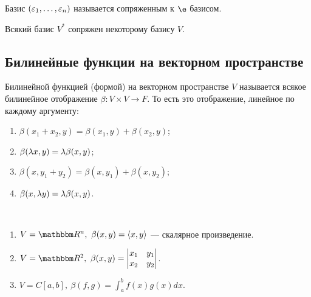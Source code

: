 \begin{Def}
Базис $(\varepsilon_1, \ldots, \varepsilon_n)$ называется сопряженным к $\e$ базисом.
\end{Def}

\begin{Task}
Всякий базис $V^*$ сопряжен некоторому базису $V$.
\end{Task}

\subsection*{Билинейные функции на векторном пространстве}

\begin{Def}
Билинейной функцией (формой) на векторном пространстве $V$ называется всякое билинейное отображение $\beta \colon V \times V \rightarrow F$. То есть это отображение, линейное по каждому аргументу:
\begin{enumerate}
\item $\beta(x_1 + x_2, y) = \beta(x_1, y) + \beta(x_2, y)$; 
\item $\beta(\lambda x, y) = \lambda\beta(x, y)$;
\item $\beta(x, y_1 + y_2) = \beta(x, y_1) + \beta(x, y_2)$;
\item $\beta(x, \lambda y) = \lambda\beta(x, y)$.
\end{enumerate}
\end{Def}

\begin{Examples}\
\begin{enumerate}
\item $V = \R^n,\ \beta(x, y) = \langle x, y \rangle$ --- скалярное произведение. 
\item $V = \R^2,\ \beta(x, y) = \begin{vmatrix}x_1 & y_1 \\ x_2 & y_2\end{vmatrix}$.
\item $V = C[a, b],\ \beta(f, g) = \int_a^bf(x)g(x)dx$.
\end{enumerate}
\end{Examples}


